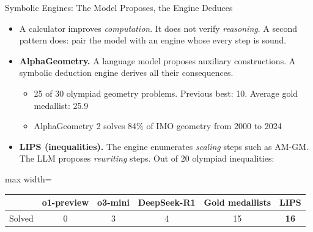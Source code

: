 \begin{frame}{Symbolic Engines: The Model Proposes, the Engine Deduces}
    \begin{itemize}\itemsep0.4em
        \item A calculator improves \emph{computation}. It does not verify \emph{reasoning}. A second pattern does: pair the model with an engine whose every step is sound.
        \item \textbf{AlphaGeometry.} A language model proposes auxiliary constructions. A symbolic deduction engine derives all their consequences.
        \begin{itemize}\itemsep0.1em
            \item 25 of 30 olympiad geometry problems. Previous best: 10. Average gold medallist: 25.9
            \item AlphaGeometry 2 solves 84\% of IMO geometry from 2000 to 2024
        \end{itemize}
        \item \textbf{LIPS (inequalities).} The engine enumerates \emph{scaling} steps such as AM-GM. The LLM proposes \emph{rewriting} steps. Out of 20 olympiad inequalities:
    \end{itemize}
    \begin{center}
    \small
    \begin{adjustbox}{max width=\linewidth}\begin{tabular}{lccccc}
        \toprule
        & \textbf{o1-preview} & \textbf{o3-mini} & \textbf{DeepSeek-R1} & \textbf{Gold medallists} & \textbf{LIPS} \\
        \midrule
        Solved & 0 & 3 & 4 & 15 & \textbf{16} \\
        \bottomrule
    \end{tabular}\end{adjustbox}
    \end{center}
\end{frame}

